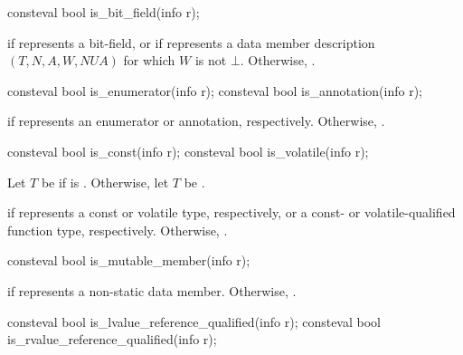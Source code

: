 %
\begin{itemdecl}
consteval bool is_bit_field(info r);
\end{itemdecl}

\begin{itemdescr}
\pnum
\returns
{} if  represents a bit-field,
or if  represents a data member description
$(T, N, A, W, \mathit{NUA})$
for which $W$ is not $\bot$.
Otherwise, .
\end{itemdescr}

%
%
\begin{itemdecl}
consteval bool is_enumerator(info r);
consteval bool is_annotation(info r);
\end{itemdecl}

\begin{itemdescr}
\pnum
\returns
{} if  represents an enumerator or annotation, respectively.
Otherwise, .
\end{itemdescr}

%
%
\begin{itemdecl}
consteval bool is_const(info r);
consteval bool is_volatile(info r);
\end{itemdecl}

\begin{itemdescr}
\pnum
Let $T$ be  if  is .
Otherwise, let $T$ be .

\pnum
\returns
{} if  represents a const or volatile type, respectively,
or a const- or volatile-qualified function type, respectively.
Otherwise, .
\end{itemdescr}

%
\begin{itemdecl}
consteval bool is_mutable_member(info r);
\end{itemdecl}

\begin{itemdescr}
\pnum
\returns
{} if  represents a  non-static data member.
Otherwise, .
\end{itemdescr}

%
%
\begin{itemdecl}
consteval bool is_lvalue_reference_qualified(info r);
consteval bool is_rvalue_reference_qualified(info r);
\end{itemdecl}

